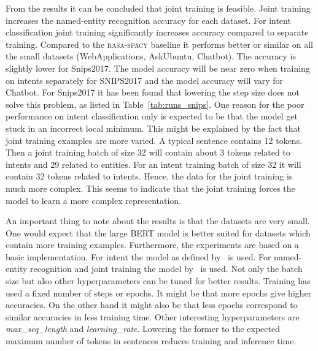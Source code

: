 From the results it can be concluded that joint training is feasible.
Joint training increases the named-entity recognition accuracy for each dataset.
For intent classification joint training significantly increases accuracy compared to separate training.
Compared to the \textsc{rasa-spacy} baseline it performs better or similar on all the small datasets (WebApplications, AskUbuntu, Chatbot).
The accuracy is slightly lower for Snips2017.
The model accuracy will be near zero when training on intents separately for SNIPS2017 and the model accuracy will vary for Chatbot.
For Snips2017 it has been found that lowering the step size does not solve this problem, as listed in Table~\ref{tab:runs_snips}.
One reason for the poor performance on intent classification only is expected to be that the model get stuck in an incorrect local minimum.
This might be explained by the fact that joint training examples are more varied.
A typical sentence contains 12 tokens.
Then a joint training batch of size 32 will contain about 3 tokens related to intents and 29 related to entities.
For an intent training batch of size 32 it will contain 32 tokens related to intents.
Hence, the data for the joint training is much more complex.
This seems to indicate that the joint training forces the model to learn a more complex representation.

An important thing to note about the results is that the datasets are very small.
One would expect that the large BERT model is better suited for datasets which contain more training examples.
Furthermore, the experiments are based on a basic implementation.
For intent the model as defined by~\citet{devlin2018github} is used.
For named-entity recognition and joint training the model by~\citet{kyzhouhzau2018ner} is used.
Not only the batch size but also other hyperparameters can be tuned for better results.
Training has used a fixed number of steps or epochs.
It might be that more epochs give higher accuracies.
On the other hand it might also be that less epochs correspond to similar accuracies in less training time.
Other interesting hyperparameters are \textit{max\_seq\_length} and \textit{learning\_rate}.
Lowering the former to the expected maximum number of tokens in sentences reduces training and inference time.

